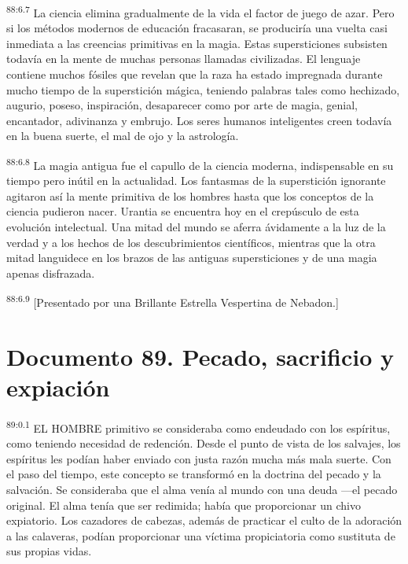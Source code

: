 \documentclass[twoside, 11pt]{book}
\begin{document}
\par
\textsuperscript{88:6.7} La ciencia elimina gradualmente de la vida el factor de juego de azar. Pero si los métodos modernos de educación fracasaran, se produciría una vuelta casi inmediata a las creencias primitivas en la magia. Estas supersticiones subsisten todavía en la mente de muchas personas llamadas civilizadas. El lenguaje contiene muchos fósiles que revelan que la raza ha estado impregnada durante mucho tiempo de la superstición mágica, teniendo palabras tales como hechizado, augurio, poseso, inspiración, desaparecer como por arte de magia, genial, encantador, adivinanza y embrujo. Los seres humanos inteligentes creen todavía en la buena suerte, el mal de ojo y la astrología.

\par
\textsuperscript{88:6.8} La magia antigua fue el capullo de la ciencia moderna, indispensable en su tiempo pero inútil en la actualidad. Los fantasmas de la superstición ignorante agitaron así la mente primitiva de los hombres hasta que los conceptos de la ciencia pudieron nacer. Urantia se encuentra hoy en el crepúsculo de esta evolución intelectual. Una mitad del mundo se aferra ávidamente a la luz de la verdad y a los hechos de los descubrimientos científicos, mientras que la otra mitad languidece en los brazos de las antiguas supersticiones y de una magia apenas disfrazada.

\par
\textsuperscript{88:6.9} [Presentado por una Brillante Estrella Vespertina de Nebadon.]


\chapter{Documento 89. Pecado, sacrificio y expiación}
\par
\textsuperscript{89:0.1} EL HOMBRE primitivo se consideraba como endeudado con los espíritus, como teniendo necesidad de redención. Desde el punto de vista de los salvajes, los espíritus les podían haber enviado con justa razón mucha más mala suerte. Con el paso del tiempo, este concepto se transformó en la doctrina del pecado y la salvación. Se consideraba que el alma venía al mundo con una deuda ---el pecado original. El alma tenía que ser redimida; había que proporcionar un chivo expiatorio. Los cazadores de cabezas, además de practicar el culto de la adoración a las calaveras, podían proporcionar una víctima propiciatoria como sustituta de sus propias vidas.
\end{document}
